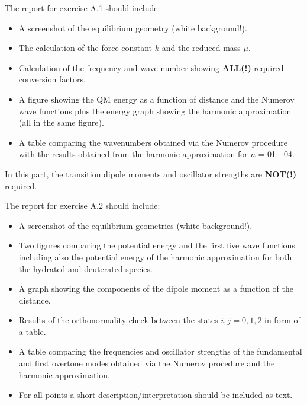 \documentclass[
  letterpaper,
]{article}
\providecommand{\tightlist}{%
  \setlength{\itemsep}{0pt}\setlength{\parskip}{0pt}}\usepackage{longtable,booktabs,array}
\begin{document}
The report for exercise A.1 should include:

\begin{itemize}
\tightlist
\item[$\square$]
  A screenshot of the equilibrium geometry (white background!).
\item[$\square$]
  The calculation of the force constant \(k\) and the reduced mass
  \(\mu\).
\item[$\square$]
  Calculation of the frequency and wave number showing \textbf{ALL(!)}
  required conversion factors.
\item[$\square$]
  A figure showing the QM energy as a function of distance and the
  Numerov wave functions plus the energy graph showing the harmonic
  approximation (all in the same figure).
\item[$\square$]
  A table comparing the wavenumbers obtained via the Numerov procedure
  with the results obtained from the harmonic approximation for \(n\) =
  01 - 04.
\end{itemize}

\begin{tcolorbox}[enhanced jigsaw, toptitle=1mm, opacitybacktitle=0.6, colframe=quarto-callout-note-color-frame, toprule=.15mm, breakable, bottomrule=.15mm, left=2mm, title=\textcolor{quarto-callout-note-color}{\faInfo}\hspace{0.5em}{Note}, titlerule=0mm, leftrule=.75mm, bottomtitle=1mm, coltitle=black, arc=.35mm, rightrule=.15mm, opacityback=0, colback=white, colbacktitle=quarto-callout-note-color!10!white]

In this part, the transition dipole moments and oscillator strengths are
\textbf{NOT(!)} required.

\end{tcolorbox}

The report for exercise A.2 should include:

\begin{itemize}
\tightlist
\item[$\square$]
  A screenshot of the equilibrium geometries (white background!).
\item[$\square$]
  Two figures comparing the potential energy and the first five wave
  functions including also the potential energy of the harmonic
  approximation for both the hydrated and deuterated species.
\item[$\square$]
  A graph showing the components of the dipole moment as a function of
  the distance.
\item[$\square$]
  Results of the orthonormality check between the states
  \(i, j = {0,1,2}\) in form of a table.
\item[$\square$]
  A table comparing the frequencies and oscillator strengths of the
  fundamental and first overtone modes obtained via the Numerov
  procedure and the harmonic approximation.
\item[$\square$]
  For all points a short description/interpretation should be included
  as text.
\end{itemize}
\end{document}

